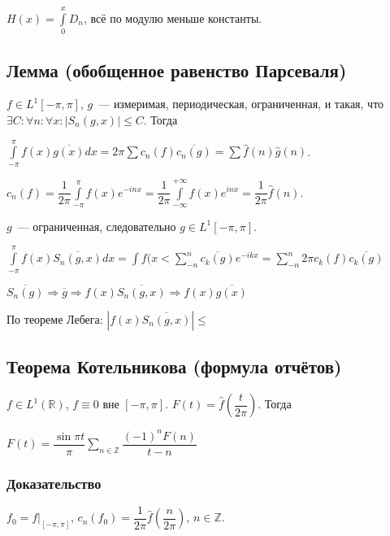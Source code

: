 \documentclass{article}
\begin{document}
        $H(x) = \int\limits^x_0 D_n$, всё по модулю меньше константы.
        
    \subsection{Лемма (обобщенное равенство Парсеваля)}
    
        $f \in L^1 [-\pi, \pi]$, $g$~--- измеримая, периодическая, ограниченная, и такая, что $\exists C : \forall n : \forall x : \left| S_n(g, x) \right| \leqslant C$. Тогда
        
        $\int\limits^{\pi}_{-\pi} f(x) \overline{g(x)} dx = 2 \pi \sum c_n(f) \overline{c_n(g)} = \sum \hat{f}(n) \hat{g}(n)$.
        
        $c_n(f) = \dfrac{1}{2 \pi} \int\limits^{\pi}_{-\pi} f(x) e^{-inx} = \dfrac{1}{2 \pi} \int\limits^{+\infty}_{-\infty} f(x) e^{inx} = \dfrac{1}{2 \pi} \hat{f}(n)$.
        
        $g$~--- ограниченная, следовательно $g \in L^1 [-\pi, \pi]$.
        
        $\int\limits^{\pi}_{-\pi} f(x) \overline{S_n(g, x)} dx = \int f(x< \sum\limits^n_{-n} \overline{c_k(g)} e^{-ikx} = \sum\limits^n_{-n} 2 \pi c_k(f) \overline{c_k(g)}$
        
        $\overline{S_n(g)} \Rightarrow \overline{g} \Rightarrow f(x) \overline{S_n(g, x)} \Rightarrow f(x) \overline{g(x)}$
        
        По теореме Лебега: $\left| f(x) \overline{S_n(g, x)} \right| \leqslant $
        
    \subsection{Теорема Котельникова (формула отчётов)}
    
        $f \in L^1 (\mathbb{R})$, $f \equiv 0$ вне $[-\pi, \pi]$. $F(t) = \hat{f} \left(\dfrac{t}{2 \pi} \right)$. Тогда
        
        $F(t) = \dfrac{\sin \pi t}{\pi} \sum\limits_{n \in \mathbb{Z}} \dfrac{(-1)^n F(n)}{t - n}$
        
        \subsubsection{Доказательство}
            
            $f_0 = f \bigg|_{[-\pi, \pi]}$, $c_n(f_0) = \dfrac{1}{2 \pi} \hat{f} \left( \dfrac{n}{2 \pi} \right)$, $n \in \mathbb{Z}$.
        
\end{document}
